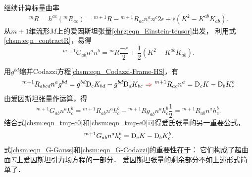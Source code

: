 继续计算标量曲率 %
\begin{equation}\label{chsm:eqn_contractR}
\begin{aligned}
    {}^{m}{R}=   h^{ac}({^{m}}{R}_{ac})
    =  {}^{m+1}{R}- {}^{m+1}{R}_{ac} {n}^{a} {n}^{c} 2 \epsilon
    +\epsilon (K^2 - K^{ab} K_{ab} )  .
\end{aligned}
\end{equation}
从$m+1$维流形$M$上的爱因斯坦张量\eqref{chrg:eqn_Einstein-tensor}出发，
利用式\eqref{chsm:eqn_contractR}，易得
\begin{equation}\label{chsm:eqn_G-Gauss}
     {}^{m+1}G_{ab} {n}^{a} {n}^{b}=  {}^{m}{R}\frac{-\epsilon}{2}
    + \frac{1}{2} (K^2 - K^{ab} K_{ab} )  .
\end{equation}


用$g^{bd}$缩并Codazzi方程\eqref{chsm:eqn_Codazzi-Frame-HS}，有
\begin{equation}\label{chsm:eqn_tmp-c0}
    {}^{m+1}{R}_{abcd} n^a g^{bd} =   g^{bd}{\rm D}_c K_{bd} -g^{bd} {\rm D}_d K_{bc}
     {\  \color{red}\Rightarrow \  }
    {}^{m+1}{R}_{ac} n^a  =   {\rm D}_c K -{\rm D}_b K_{c}^b 
\end{equation}
由爱因斯坦张量作运算，得
\begin{equation}\label{chsm:eqn_tmp-e0}
    {}^{m+1}G_{ab}{n}^{a} h^{b}_c=  {}^{m+1}R_{ab}{n}^{a}h^{b}_c
    -{}^{m+1}R g_{ab}{n}^{a}h^{b}_c  \frac{1}{2}
    =  {}^{m+1}R_{ab}{n}^{a}h^{b}_c.
\end{equation}
结合式\eqref{chsm:eqn_tmp-c0}和\eqref{chsm:eqn_tmp-e0}可得爱氏张量的另一重要公式，
\begin{equation}\label{chsm:eqn_G-Codazzi}
    {}^{m+1}G_{ab}{n}^{a} h^{b}_c  = {\rm D}_c K -{\rm D}_b K_{c}^b .
\end{equation}
式\eqref{chsm:eqn_G-Gauss}和\eqref{chsm:eqn_G-Codazzi}的重要性在于：
它们构成了超曲面$\Sigma$上爱因斯坦引力场方程的一部分．
爱因斯坦张量的剩余部分不如上述形式简单了．



